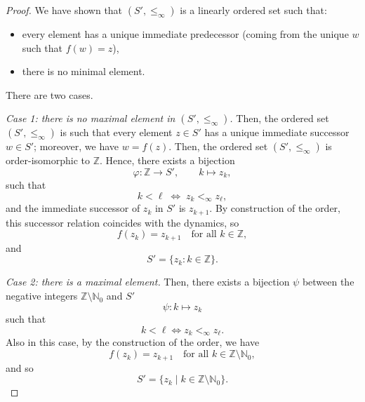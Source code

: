 \documentclass[10pt,a4paper]{amsart}
\begin{document}
\begin{proof}
We have shown that $(S',\le_\infty)$ is a linearly ordered set such that:
\begin{itemize}
\item every element has a unique immediate predecessor (coming from the unique $w$ such that $f(w)=z$),
\item there is no minimal element.
\end{itemize}
There are two cases.

\smallskip

\textit{Case 1: there is no maximal element in $(S',\le_\infty)$.} Then, the ordered set $(S',\le_\infty)$ is such that every element $z\in S'$ has a unique immediate successor $w\in S'$; moreover, we have $w=f(z)$.
Then, the ordered set $(S',\le_\infty)$ is order-isomorphic to $\mathbb{Z}$. Hence, there exists a bijection
$$
\varphi:\mathbb{Z}\to S',\qquad k\mapsto z_k,
$$
such that
$$
k<\ell \;\Longleftrightarrow\; z_k<_\infty z_\ell,
$$
and the immediate successor of $z_k$ in $S'$ is $z_{k+1}$. By construction of the order, this successor relation coincides with the dynamics, so
$$
f(z_k)=z_{k+1}\quad\text{for all }k\in\mathbb{Z},
$$
and
$$
S'=\{z_k:k\in\mathbb{Z}\}.
$$

\smallskip

\textit{Case 2: there is a maximal element.} Then, there exists a bijection $\psi$ between the negative integers $\mathbb Z\setminus\mathbb N_0$ and $S'$
$$\psi:k\mapsto z_k$$
such that
$$k<\ell\iff z_k<_\infty z_\ell.$$
Also in this case, by the construction of the order, we have
$$f(z_k)=z_{k+1}\quad\text{for all }k\in\mathbb Z\setminus\mathbb N_0,$$
and so
$$S'=\{z_k\mid k\in\mathbb Z\setminus\mathbb N_0\}.$$



\end{proof}
\end{document}
